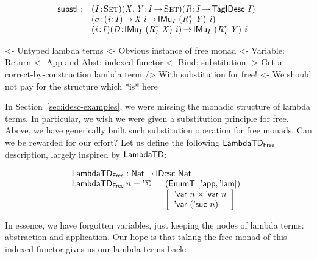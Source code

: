\[
\begin{array}{@{}ll}
\substI : & \PITEL{\V{I}}{\Set}
            \PITEL{\V{X}, \V{Y}}{\V{I} \To \Set}
            \PITEL{\V{R}}{\V{I} \To \TagIDesc{\V{I}}} \\
          & \PITEL{\V{\sigma}}{\PI{\V{i}}{\V{I}} \V{X}\:\V{i} \To 
                               \IMu{I}{(\FreeIMonad{\V{R}}{\V{I}}{\V{Y}})}{\V{i}}} \\
          & \PITEL{\V{i}}{\V{I}}
            \PITEL{\V{D}}{\IMu{I}{(\FreeIMonad{\V{R}}{\V{I}}{\V{X}})}{\V{i}}} \To
            \IMu{I}{(\FreeIMonad{\V{R}}{\V{I}}{\V{Y}})}{\V{i}}
\end{array}
\]


\begin{wstructure}
<- Untyped lambda terms
    <- Obvious instance of free monad
        <- Variable: Return
        <- App and Abst: indexed functor
        <- Bind: substitution
    -> Get a correct-by-construction lambda term
        /> With substitution for free!
        <- We should not pay for the structure which *is* here
\end{wstructure}

In Section~\ref{sec:idesc-examples}, we were missing the monadic
structure of lambda terms. In particular, we wish we were given a
substitution principle for free. Above, we have generically built such
substitution operation for free monads. Can we be rewarded for our
effort? Let us define the following $\LambdaTFreeD$ description,
largely inspired by $\LambdaTD$:

\[\stk{
\LambdaTFreeD : \Nat \To \IDesc{\Nat} \\
\begin{array}{@{}ll}
\LambdaTFreeD\: n = \DSigma{}{} & (\EnumT [ \LambdaTApp, \LambdaTLam ]) \\
                                & \left[\begin{array}{l}
                                  \DProd{\DVar{n}}{\DVar{n}} \\
                                  \DVar{(\NatSuc{n})}
                                  \end{array}\right]
\end{array}
}\]

In essence, we have forgotten variables, just keeping the nodes of
lambda terms: abstraction and application. Our hope is that taking the
free monad of this indexed functor gives us our lambda terms back:


